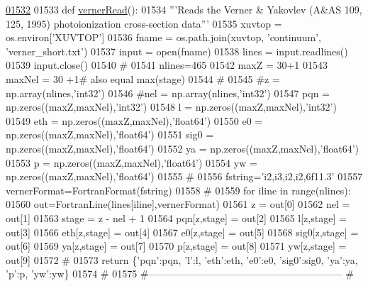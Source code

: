 \begin{DoxyCode}
\hypertarget{namespacepyneb_1_1utils_1_1__chianti__tools_l01532}{}\hyperlink{namespacepyneb_1_1utils_1_1__chianti__tools_a4777bd65c87b9fbd20a5b02185d9437c}{01532} 
01533 \textcolor{keyword}{def }\hyperlink{namespacepyneb_1_1utils_1_1__chianti__tools_a4777bd65c87b9fbd20a5b02185d9437c}{vernerRead}():
01534     \textcolor{stringliteral}{'''Reads the Verner & Yakovlev (A&AS 109, 125, 1995) photoionization cross-section data'''}
01535     xuvtop = os.environ[\textcolor{stringliteral}{'XUVTOP'}]
01536     fname = os.path.join(xuvtop, \textcolor{stringliteral}{'continuum'}, \textcolor{stringliteral}{'verner\_short.txt'})
01537     input = open(fname)
01538     lines = input.readlines()
01539     input.close()
01540     \textcolor{comment}{#}
01541     nlines=465
01542     maxZ = 30+1
01543     maxNel = 30 +1\textcolor{comment}{# also equal max(stage)}
01544     \textcolor{comment}{#}
01545     \textcolor{comment}{#z = np.array(nlines,'int32')}
01546     \textcolor{comment}{#nel = np.array(nlines,'int32')}
01547     pqn = np.zeros((maxZ,maxNel),\textcolor{stringliteral}{'int32'})
01548     l = np.zeros((maxZ,maxNel),\textcolor{stringliteral}{'int32'})
01549     eth = np.zeros((maxZ,maxNel),\textcolor{stringliteral}{'float64'})
01550     e0 = np.zeros((maxZ,maxNel),\textcolor{stringliteral}{'float64'})
01551     sig0 = np.zeros((maxZ,maxNel),\textcolor{stringliteral}{'float64'})
01552     ya = np.zeros((maxZ,maxNel),\textcolor{stringliteral}{'float64'})
01553     p = np.zeros((maxZ,maxNel),\textcolor{stringliteral}{'float64'})
01554     yw = np.zeros((maxZ,maxNel),\textcolor{stringliteral}{'float64'})
01555     \textcolor{comment}{#}
01556     fstring=\textcolor{stringliteral}{'i2,i3,i2,i2,6f11.3'}
01557     vernerFormat=FortranFormat(fstring)
01558     \textcolor{comment}{#}
01559     \textcolor{keywordflow}{for} iline \textcolor{keywordflow}{in} range(nlines):
01560         out=FortranLine(lines[iline],vernerFormat)
01561         z = out[0]
01562         nel = out[1]
01563         stage = z - nel + 1
01564         pqn[z,stage] = out[2]
01565         l[z,stage] = out[3]
01566         eth[z,stage] = out[4]
01567         e0[z,stage] = out[5]
01568         sig0[z,stage] = out[6]
01569         ya[z,stage] = out[7]
01570         p[z,stage] = out[8]
01571         yw[z,stage] = out[9]
01572     \textcolor{comment}{#}
01573     \textcolor{keywordflow}{return} \{\textcolor{stringliteral}{'pqn'}:pqn, \textcolor{stringliteral}{'l'}:l, \textcolor{stringliteral}{'eth'}:eth, \textcolor{stringliteral}{'e0'}:e0, \textcolor{stringliteral}{'sig0'}:sig0, \textcolor{stringliteral}{'ya'}:ya, \textcolor{stringliteral}{'p'}:p, \textcolor{stringliteral}{'yw'}:yw\}
01574     \textcolor{comment}{#}
01575     \textcolor{comment}{#-----------------------------------------------------------}
    \textcolor{comment}{#}
\end{DoxyCode}
